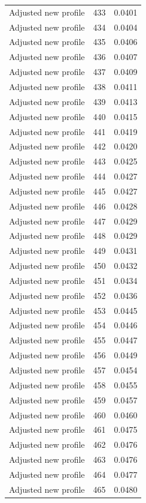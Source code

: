 \begin{table}[htbp]
\begin{tabular}{lll}
Adjusted new profile & 433 & 0.0401 \\
Adjusted new profile & 434 & 0.0404 \\
Adjusted new profile & 435 & 0.0406 \\
Adjusted new profile & 436 & 0.0407 \\
Adjusted new profile & 437 & 0.0409 \\
Adjusted new profile & 438 & 0.0411 \\
Adjusted new profile & 439 & 0.0413 \\
Adjusted new profile & 440 & 0.0415 \\
Adjusted new profile & 441 & 0.0419 \\
Adjusted new profile & 442 & 0.0420 \\
Adjusted new profile & 443 & 0.0425 \\
Adjusted new profile & 444 & 0.0427 \\
Adjusted new profile & 445 & 0.0427 \\
Adjusted new profile & 446 & 0.0428 \\
Adjusted new profile & 447 & 0.0429 \\
Adjusted new profile & 448 & 0.0429 \\
Adjusted new profile & 449 & 0.0431 \\
Adjusted new profile & 450 & 0.0432 \\
Adjusted new profile & 451 & 0.0434 \\
Adjusted new profile & 452 & 0.0436 \\
Adjusted new profile & 453 & 0.0445 \\
Adjusted new profile & 454 & 0.0446 \\
Adjusted new profile & 455 & 0.0447 \\
Adjusted new profile & 456 & 0.0449 \\
Adjusted new profile & 457 & 0.0454 \\
Adjusted new profile & 458 & 0.0455 \\
Adjusted new profile & 459 & 0.0457 \\
Adjusted new profile & 460 & 0.0460 \\
Adjusted new profile & 461 & 0.0475 \\
Adjusted new profile & 462 & 0.0476 \\
Adjusted new profile & 463 & 0.0476 \\
Adjusted new profile & 464 & 0.0477 \\
Adjusted new profile & 465 & 0.0480 \\

\end{tabular}
\end{table}
